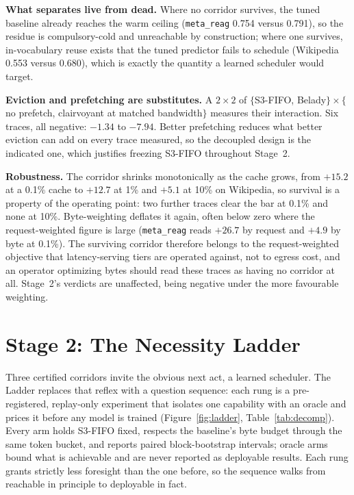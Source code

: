\documentclass[letterpaper]{article} %
\begin{document}
\textbf{What separates live from dead.} Where no corridor survives, the tuned baseline already reaches the warm ceiling (\texttt{meta\_reag} 0.754 versus 0.791), so the residue is compulsory-cold and unreachable by construction; where one survives, in-vocabulary reuse exists that the tuned predictor fails to schedule (Wikipedia 0.553 versus 0.680), which is exactly the quantity a learned scheduler would target.

\textbf{Eviction and prefetching are substitutes.} A $2\times2$ of $\{$S3-FIFO, Belady$\}\times\{$no prefetch, clairvoyant at matched bandwidth$\}$ measures their interaction. Six traces, all negative: $-1.34$ to $-7.94$. Better prefetching reduces what better eviction can add on every trace measured, so the decoupled design is the indicated one, which justifies freezing S3-FIFO throughout Stage~2.

\textbf{Robustness.} The corridor shrinks monotonically as the cache grows, from $+15.2$ at a 0.1\% cache to $+12.7$ at 1\% and $+5.1$ at 10\% on Wikipedia, so survival is a property of the operating point: two further traces clear the bar at 0.1\% and none at 10\%. Byte-weighting deflates it again, often below zero where the request-weighted figure is large (\texttt{meta\_reag} reads $+26.7$ by request and $+4.9$ by byte at 0.1\%). The surviving corridor therefore belongs to the request-weighted objective that latency-serving tiers are operated against, not to egress cost, and an operator optimizing bytes should read these traces as having no corridor at all. Stage~2's verdicts are unaffected, being negative under the more favourable weighting.


\section{Stage 2: The Necessity Ladder}
Three certified corridors invite the obvious next act, a learned scheduler. The Ladder replaces that reflex with a question sequence: each rung is a pre-registered, replay-only experiment that isolates one capability with an oracle and prices it before any model is trained (Figure~\ref{fig:ladder}, Table~\ref{tab:decomp}). Every arm holds S3-FIFO fixed, respects the baseline's byte budget through the same token bucket, and reports paired block-bootstrap intervals; oracle arms bound what is achievable and are never reported as deployable results. Each rung grants strictly less foresight than the one before, so the sequence walks from reachable in principle to deployable in fact.
\end{document}
